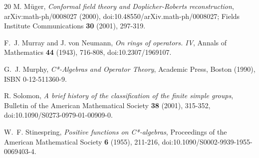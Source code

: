 \documentclass[11pt,letterpaper]{article}
\theoremstyle{definition}
\theoremstyle{remark}
\begin{document}
\begin{thebibliography}{20}
M. M\"uger,
\emph{Conformal field theory and Doplicher-Roberts reconstruction},
arXiv:math-ph/0008027 (2000), doi:10.48550/arXiv.math-ph/0008027; Fields Institute Communications \textbf{30} (2001), 297-319.

F.~J. Murray and J. von Neumann,
\emph{On rings of operators. IV},
Annals of Mathematics \textbf{44} (1943), 716-808, doi:10.2307/1969107.

G.~J. Murphy,
\emph{C*-Algebras and Operator Theory},
Academic Press, Boston (1990), ISBN 0-12-511360-9.

R. Solomon,
\emph{A brief history of the classification of the finite simple groups},
Bulletin of the American Mathematical Society \textbf{38} (2001), 315-352, doi:10.1090/S0273-0979-01-00909-0.

W.~F. Stinespring,
\emph{Positive functions on C*-algebras},
Proceedings of the American Mathematical Society \textbf{6} (1955), 211-216, doi:10.1090/S0002-9939-1955-0069403-4.

\end{thebibliography}
\end{document}
